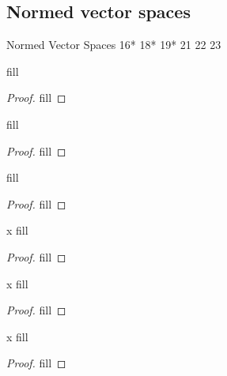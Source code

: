 \subsection{Normed vector spaces}

Normed Vector Spaces 
16*
18*
19*
21
22
23


\begin{exercise}{16}
fill
\end{exercise}
\begin{proof}
fill
\end{proof} 

\begin{exercise}{18}
fill
\end{exercise}
\begin{proof}
fill
\end{proof} 

\begin{exercise}{19}
fill
\end{exercise}
\begin{proof}
fill
\end{proof} 

\begin{exercise}{x}
fill
\end{exercise}
\begin{proof}
fill
\end{proof} 

\begin{exercise}{x}
fill
\end{exercise}
\begin{proof}
fill
\end{proof} 

\begin{exercise}{x}
fill
\end{exercise}
\begin{proof}
fill
\end{proof} 
